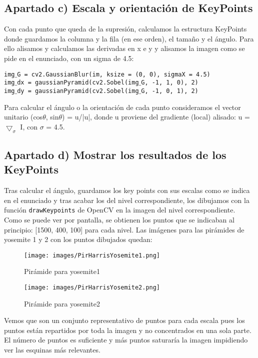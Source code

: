 \documentclass[12pt]{article}
\begin{document}
\subsection*{Apartado c) Escala y orientación de KeyPoints}
Con cada punto que queda de la supresión, calculamos la estructura KeyPoints donde guardamos la columna y la fila (en ese orden), el tamaño y el ángulo. Para ello alisamos y calculamos las derivadas en x e y y alisamos la imagen como se pide en el enunciado, con un sigma de 4.5:\\
\begin{center}
\texttt{img$\_$G = cv2.GaussianBlur(im, ksize = (0, 0), sigmaX = 4.5)}\\
\texttt{img$\_$dx = gaussianPyramid(cv2.Sobel(img$\_$G, -1, 1, 0), 2)}\\
\texttt{img$\_$dy = gaussianPyramid(cv2.Sobel(img$\_$G, -1, 0, 1), 2)}\\
\end{center}
Para calcular el ángulo o la orientación de cada punto consideramos el vector unitario (cos$\theta$, sin$\theta$) = u/|u|, donde u proviene del gradiente (local) alisado: u = $\bigtriangledown_{\sigma}$ I, con $\sigma$ = 4.5.\\
\subsection*{Apartado d) Mostrar los resultados de los KeyPoints}
Tras calcular el ángulo, guardamos los key points con sus escalas como se indica en el enunciado y tras acabar los del nivel correspondiente, los dibujamos con la función \texttt{drawKeypoints} de OpenCV en la imagen del nivel correspondiente.\\
Como se puede ver por pantalla, se obtienen los puntos que se indicaban al principio: [1500, 400, 100] para cada nivel. Las imágenes para las pirámides de yosemite 1 y 2 con los puntos dibujados quedan:
\begin{figure}[H]
\centering
\parbox{8cm}{
\texttt{[image: images/PirHarrisYosemite1.png]}
\caption{Pirámide para yosemite1}
\label{fig:2figsA}}
\begin{minipage}{8cm}
\texttt{[image: images/PirHarrisYosemite2.png]}
\caption{Pirámide para yosemite2}
\label{fig:2figsB}
\end{minipage}
\end{figure}
Vemos que son un conjunto representativo de puntos para cada escala pues los puntos están repartidos por toda la imagen y no concentrados en una sola parte. El número de puntos es suficiente y más puntos saturaría la imagen impidiendo ver las esquinas más relevantes.
\end{document}

